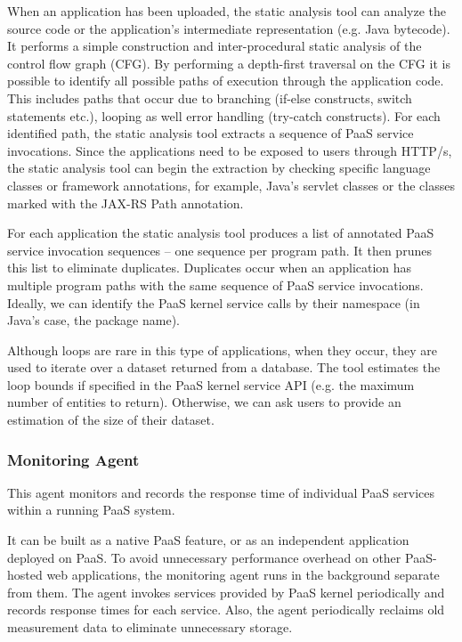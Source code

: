 When an application has been uploaded, the static analysis tool can analyze the source code 
or the application's intermediate representation (e.g. Java bytecode). It performs a simple 
construction and inter-procedural static analysis of the control flow graph (CFG).
By performing a depth-first traversal on the CFG it is possible to identify all possible paths
of execution through the application code. This includes paths that occur due to branching (if-else constructs, 
switch statements etc.), looping as well error handling (try-catch constructs). 
For each identified path, the static analysis tool extracts a sequence of PaaS service 
invocations. Since the applications need to be exposed to users through HTTP/s, 
the static analysis tool can begin the extraction by checking specific language classes
or framework annotations, for example, Java's servlet classes or the classes marked with
the JAX-RS Path annotation.

For each application the static analysis tool produces a list of annotated PaaS 
service invocation sequences -- one sequence per program path.
It then prunes this list to eliminate duplicates. Duplicates occur when an application has multiple program
paths with the same sequence of PaaS service invocations.
Ideally, we can identify the PaaS kernel service calls by their namespace 
(in Java's case, the package name).

Although loops are rare in this type of applications, when they occur, they are used to 
iterate over a dataset returned from a database. The tool estimates the loop 
bounds if specified in the PaaS kernel service API (e.g. the maximum number of entities to return). 
Otherwise, we can ask users to provide an estimation of the size of their dataset.

\subsubsection{Monitoring Agent}
This agent monitors and records the response time of individual PaaS services within a running PaaS system.

It can be built as a native PaaS feature, or as an independent application deployed on PaaS. To avoid unnecessary
performance overhead on other PaaS-hosted web applications, the monitoring agent runs in the background separate from them.
The agent invokes services provided by PaaS kernel periodically and records response times for each service. Also, the agent periodically
reclaims old measurement data to eliminate unnecessary storage.

